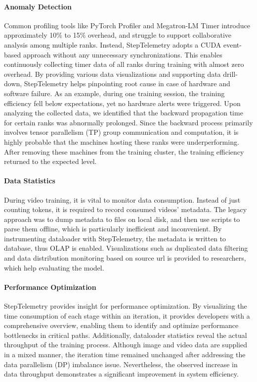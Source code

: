 \paragraph{Anomaly Detection} Common profiling tools like PyTorch Profiler and Megatron-LM Timer introduce approximately 10\% to 15\% overhead, and struggle to support collaborative analysis among multiple ranks. Instead, StepTelemetry adopts a CUDA event-based approach without any unnecessary synchronizations. This enables continuously collecting timer data of all ranks during training with almost zero overhead. By providing various data visualizations and supporting data drill-down, StepTelemetry helps pinpointing root cause in case of hardware and software failure. 
As an example, during one training session, the training efficiency fell below expectations, yet no hardware alerts were triggered. Upon analyzing the collected data, we identified that the backward propagation time for certain ranks was abnormally prolonged. Since the backward process primarily involves tensor parallelism (TP) group communication and computation, it is highly probable that the machines hosting these ranks were underperforming. After removing these machines from the training cluster, the training efficiency returned to the expected level.
\paragraph{Data Statistics} During video training, it is vital to monitor data consumption. Instead of just counting tokens, it is required to record consumed videos' metadata. The legacy approach was to dump metadata to files on local disk, and then use scripts to parse them offline, which is particularly inefficient and inconvenient. By instrumenting dataloader with StepTelemetry, the metadata is written to database, thus OLAP is enabled. Visualizations such as duplicated data filtering and data distribution monitoring based on source url is provided to researchers, which help evaluating the model.
\paragraph{Performance Optimization} StepTelemetry provides insight for performance optimization. By visualizing the time consumption of each stage within an iteration, it provides developers with a comprehensive overview, enabling them to identify and optimize performance bottlenecks in critical paths. Additionally, dataloader statistics reveal the actual throughput of the training process. Although image and video data are supplied in a mixed manner, the iteration time remained unchanged after addressing the data parallelism (DP) imbalance issue. Nevertheless, the observed increase in data throughput demonstrates a significant improvement in system efficiency.



